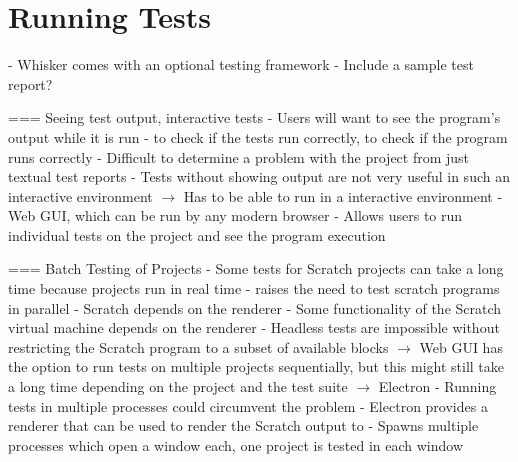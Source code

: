 \section{Running Tests}
\label{sec:running_tests}
- Whisker comes with an optional testing framework
- Include a sample test report?

=== Seeing test output, interactive tests
- Users will want to see the program's output while it is run
    - to check if the tests run correctly, to check if the program runs correctly
    - Difficult to determine a problem with the project from just textual test reports
    - Tests without showing output are not very useful in such an interactive environment
$\rightarrow$ Has to be able to run in a interactive environment
    - Web GUI, which can be run by any modern browser
    - Allows users to run individual tests on the project and see the program execution

=== Batch Testing of Projects
- Some tests for Scratch projects can take a long time because projects run in real time
    - raises the need to test scratch programs in parallel
    - Scratch depends on the renderer
        - Some functionality of the Scratch virtual machine depends on the renderer
        - Headless tests are impossible without restricting the Scratch program to a subset of available blocks
$\rightarrow$ Web GUI has the option to run tests on multiple projects sequentially, but this might still take a long time depending on the project and the test suite
$\rightarrow$ Electron
    - Running tests in multiple processes could circumvent the problem
    - Electron provides a renderer that can be used to render the Scratch output to
    - Spawns multiple processes which open a window each, one project is tested in each window
